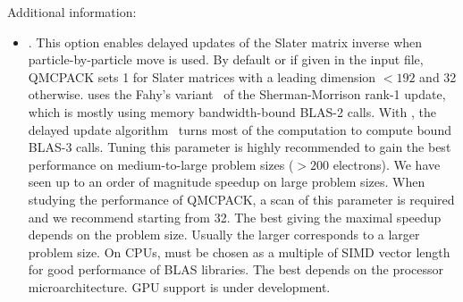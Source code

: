 Additional information:
\begin{itemize}
\item {}. This option enables delayed updates of the Slater matrix inverse when particle-by-particle move is used.
By default or if  given in the input file, QMCPACK sets 1 for Slater matrices with a leading dimension $<192$ and 32 otherwise.
 uses the Fahy's variant~\cite{Fahy1990} of the Sherman-Morrison rank-1 update, which is mostly using memory bandwidth-bound BLAS-2 calls.
With , the delayed update algorithm~\cite{Luo2018delayedupdate,McDaniel2017} turns most of the computation to compute bound BLAS-3 calls.
Tuning this parameter is highly recommended to gain the best performance on medium-to-large problem sizes ($>200$ electrons).
We have seen up to an order of magnitude speedup on large problem sizes.
When studying the performance of QMCPACK, a scan of this parameter is required and we recommend starting from 32.
The best  giving the maximal speedup depends on the problem size.
Usually the larger  corresponds to a larger problem size.
On CPUs,  must be chosen as a multiple of SIMD vector length for good performance of BLAS libraries.
The best  depends on the processor microarchitecture.
GPU support is under development.
\end{itemize}

